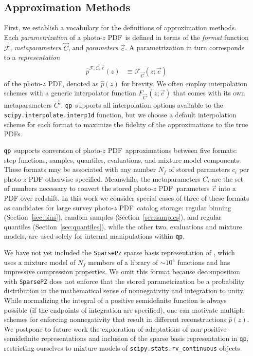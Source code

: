 \documentclass[\docopts]{\docclass}
\newcommand{\qp}{\texttt{qp}\xspace}
\newcommand{\pz}{photo-$z$ PDF\xspace}
\begin{document}
\subsection{Approximation Methods}
\label{sec:approx}

First, we establish a vocabulary for the definitions of approximation methods.
Each \textit{parametrization} of a \pz\ is defined in terms of the 
\textit{format} function $\mathcal{F}$, \textit{metaparameters} $\vec{C}$, and 
\textit{parameters} $\vec{c}$.
A parametrization in turn corresponds to a \textit{representation}
\begin{align}
  \label{eq:definition}
  \hat{p}^{\mathcal{F}, \vec{C}, \vec{c}}(z) &\equiv \mathcal{F}_{\vec{C}}(z; 
\vec{c})
\end{align}
of the \pz, denoted as $\hat{p}(z)$ for brevity.
We often employ interpolation schemes with a generic interpolator function 
$F_{\vec{C}'}(z; \vec{c})$ that comes with its own metaparameters $\vec{C}'$.
\qp\ supports all interpolation options available to the 
\texttt{scipy.interpolate.interp1d} function, but we choose a default 
interpolation scheme for each format to maximize the fidelity of the 
approximations to the true PDFs.

\qp\ supports conversion of \pz\ approximations between five formats: step 
functions, samples, quantiles, evaluations, and mixture model components.
These formats may be associated with any number $N_{f}$ of stored parameters 
$c_{i}$ per \pz%
otherwise specified.
Meanwhile, the metaparameters $C_{i}$ are the set of numbers necessary to 
convert the stored \pz\ parameters $\vec{c}$ into a PDF over redshift.
In this work we consider special cases of three of these formats as candidates 
for large survey \pz\ catalog storage: regular binning 
(Section~\ref{sec:bins}), random samples (Section~\ref{sec:samples}), and 
regular quantiles (Section~\ref{sec:quantiles}), while the other two, 
evaluations and mixture models, are used solely for internal manipulations 
within \qp.

We have not yet included the \texttt{SparsePz} sparse basis representation of 
\citet{carrasco_kind_sparse_2014}, which uses a mixture model of $N_{f}$ 
members of a library of $\sim10^{4}$ functions and has impressive compression 
properties.
We omit this format because decomposition with \texttt{SparsePZ} does not 
enforce that the stored parametrization be a probability distribution in the 
mathematical sense of nonnegativity and integration to unity.
While normalizing the integral of a positive semidefinite function is always 
possible (if the endpoints of integration are specified), one can motivate 
multiple schemes for enforcing nonnegativity that result in different 
reconstructions $\hat{p}(z)$.
We postpone to future work the exploration of adaptations of non-positive 
semidefinite representations and inclusion of the sparse basis representation 
in \qp, restricting ourselves to mixture models of 
\texttt{scipy.stats.rv\_continuous} objects.
\end{document}
